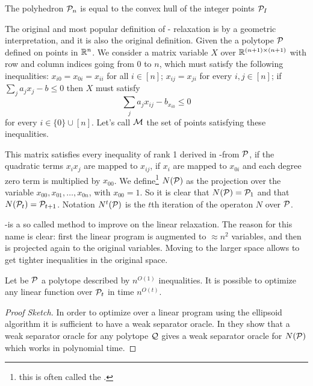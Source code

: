 \documentclass[a4paper,twoside,justified]{tufte-handout}
\begin{document}
\begin{theorem}
  The polyhedron $ \mathcal{P}_{n} $ is equal to the convex hull of
  the integer points  $ \mathcal{P}_{I} $
\end{theorem}

The original and most popular definition of \Lovasz-\Schrijver
relaxation is by a geometric interpretation, and it is also the original definition. Given the a
polytope $ \mathcal{P} $ defined on points in $ \mathbb{R}^{n} $. We consider a
matrix variable $X$ over $ \mathbb{R}^{(n+1)\times(n+1)} $ with row and
column indices going from $ 0 $ to $ n $, which must satisfy the
following inequalities: $ x_{i0} = x_{0i} = x_{ii} $ for all $ i \in
[n] $; $ x_{ij}=x_{ji} $ for every $ i,j \in [n]$; if $
\sum_{j}a_{j}x_{j} - b \leq 0 $ then $ X $ must satisfy 
\begin{equation*}
  \sum_{j}a_{j}x_{ij} - b_{x_{i0}} \leq 0
\end{equation*}
for every $ i \in \{0\}\cup[n]$. Let's call $ \mathcal{M} $ the set of
points satisfying these inequalities.

This matrix satisfies every inequality of rank 1 derived in
\Lovasz-\Schrijver from $\mathcal{P}$, if the quadratic terms $ x_{i}x_{j}
$ are mapped to $ x_{ij} $, if $ x_{i} $ are mapped to $ x_{0i} $ and
each degree zero term is multiplied by $ x_{00} $. We
define\footnote{this is often called the
  .}  $ N(\mathcal{P}) $ as the
projection over the variable $ x_{00},x_{01},\ldots, x_{0n} $, with $
x_{00}=1 $. So it is clear that $ N(\mathcal{P})=\mathcal{P}_{1} $ and that $
N(\mathcal{P}_{t})=\mathcal{P}_{t+1} $. Notation $ N^{t}(\mathcal{P}) $ is the $ t
$th iteration of the operaton $ N $ over $ \mathcal{P} $.

\Lovasz-\Schrijver is a so called 
method to improve on the linear relaxation. The reason for this name
is clear: first the linear program is augmented to $ \approx n^{2} $
variables, and then is projected again to the original
variables. Moving to the larger space allows to get tighter
inequalities in the original space.

\begin{theorem}\cite{lovasz1991cones}
  Let be $\mathcal{P}$ a polytope described by $ n^{O(1)} $
  inequalities. It is possible to optimize any linear function over $
  \mathcal{P}_{t} $ in time $ n^{O(t)} $.
\end{theorem}
\begin{proof}[Proof Sketch]
  In order to optimize over a linear program using the ellipsoid
  algorithm it is sufficient to have a weak separator
  oracle. In\cite{lovasz1991cones} they show that a weak separator
  oracle for any polytope $ \mathcal{Q} $ gives a weak separator oracle
  for $ N(\mathcal{P}) $ which works in polynomial time.
\end{proof}
\end{document}
